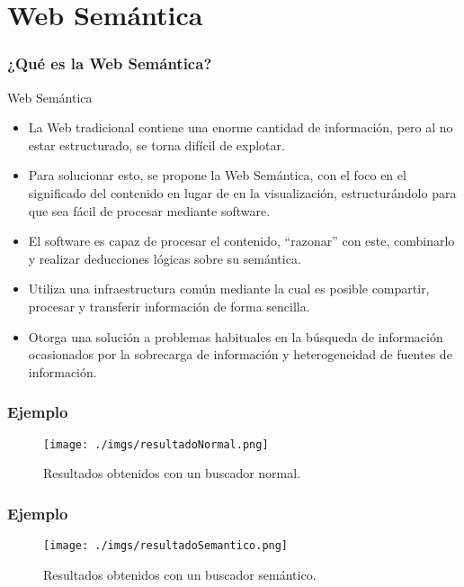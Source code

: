 \documentclass{beamer}
\begin{document}
\section{Web Semántica} 
\begin{frame}
\frametitle{¿Qué es la Web Semántica?} 
\begin{block}{Web Semántica}
\begin{itemize}
\item<1-> La Web tradicional contiene una enorme cantidad de información, pero al no estar estructurado, se torna difícil de explotar.
\item<2-> Para solucionar esto, se propone la Web Semántica, con el foco en el significado del contenido en lugar de en la visualización, estructurándolo para que sea fácil de procesar mediante software.
\item<3-> El software es capaz de procesar el contenido, ``razonar'' con este, combinarlo y realizar deducciones lógicas sobre su semántica.
\item<4-> Utiliza una infraestructura común mediante la cual es posible compartir, procesar y transferir información de forma sencilla.
\item<5-> Otorga una solución a problemas habituales en la búsqueda de información ocasionados por la sobrecarga de información y heterogeneidad de fuentes de información.
\end{itemize}
\end{block}
\end{frame}
\begin{frame}
\frametitle{Ejemplo} 
\begin{figure}[H] %
\begin{center}
\texttt{[image: ./imgs/resultadoNormal.png]}
\caption{Resultados obtenidos con un buscador normal.}
\end{center}
\end{figure}
\end{frame}
\begin{frame}
\frametitle{Ejemplo} 
\begin{figure}[H] %
\begin{center}
\texttt{[image: ./imgs/resultadoSemantico.png]}
\caption{Resultados obtenidos con un buscador semántico.}
\end{center}
\end{figure}
\end{frame}
\end{document}
